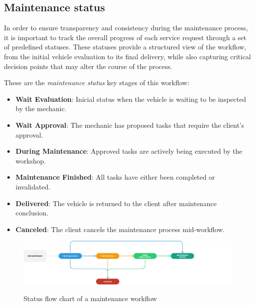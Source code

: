 \subsection{Maintenance status} 

In order to ensure transparency and consistency during the maintenance process, it is important to track the overall progress of each service request through a set of predefined statuses. These statuses provide a structured view of the workflow, from the initial vehicle evaluation to its final delivery, while also capturing critical decision points that may alter the course of the process.

These are the \textit{maintenance status} key stages of this workflow:
\begin{itemize}
    \item \textbf{Wait Evaluation}: Inicial status when the vehicle is waiting to be inspected by the mechanic.
    \item \textbf{Wait Approval}: The mechanic has proposed tasks that require the client's approval.
    \item \textbf{During Maintenance}: Approved tasks are actively being executed by the workshop.
    \item \textbf{Maintenance Finished}: All tasks have either been completed or invalidated.
    \item \textbf{Delivered}: The vehicle is returned to the client after maintenance conclusion.
    \item \textbf{Canceled}: The client cancels the maintenance process mid-workflow.
\end{itemize}

\begin{figure}[h]
  \caption{Status flow chart of a maintenance workflow}
  \centering
  \includegraphics[width=\textwidth]{figs/Status/Maintenance/StatusDiagram}
  \label{fig:maintenanceFlowChart}
\end{figure}

